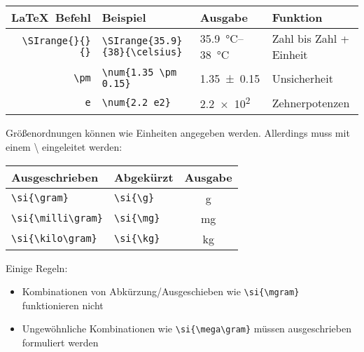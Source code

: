 \documentclass["WS\space 16-17\space -\space LaTeX-Kurs\space -\space Praesentation\space -\space 3.tex"]{subfiles}
\begin{document}
\begin{frame}[fragile]
	\begin{center}
		\begin{tabular}{r|ll|l}
			\toprule
			\LaTeX\ Befehl				& Beispiel		&Ausgabe	&	Funktion								\\ \midrule
			\lstinline|\SIrange{}{}{}|	&	\lstinline|\SIrange{35.9}{38}{\celsius}| & \SIrange{35.9}{38}{\celsius}			&	Zahl bis Zahl + Einheit				\\
			\lstinline/\pm/			&	\lstinline|\num{1.35 \pm 0.15}|	& \num{1.35 \pm 0.15}				&	 Unsicherheit					\\
			\lstinline/e/			&	\lstinline|\num{2.2 e2}|& \num{2.2 e2}					&	 Zehnerpotenzen					\\
			\bottomrule
		\end{tabular}
	\end{center}
		Größenordnungen können wie Einheiten angegeben werden. Allerdings muss mit einem {\textbackslash} eingeleitet werden:
	\begin{center}
		\begin{tabular}{ll|c}
			\toprule
			Ausgeschrieben						& Abgekürzt						& Ausgabe				\\ \midrule
			\lstinline/\si{\gram}/				&	\lstinline|\si{\g}|			& \si{\gram}			\\
			\lstinline/\si{\milli\gram}/				&	\lstinline|\si{\mg}|			& \si{\mg}			\\
			\lstinline/\si{\kilo\gram}/				&	\lstinline|\si{\kg}|			& \si{\kg} 		\\
			\bottomrule
		\end{tabular}
	\end{center}
Einige Regeln: 
\begin{itemize}
	\item Kombinationen von Abkürzung/Ausgeschieben wie \lstinline|\si{\mgram}| funktionieren nicht
	\item Ungewöhnliche Kombinationen wie \lstinline|\si{\mega\gram}| müssen ausgeschrieben formuliert werden 
\end{itemize}

\end{frame}
\end{document}
